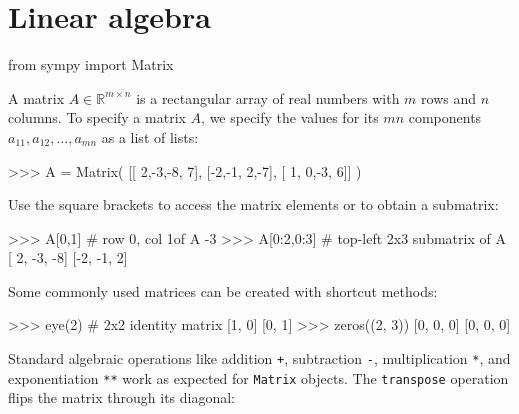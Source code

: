 



\section{Linear algebra}
\label{sec:linear_algebra}



\small
\begin{verbatimtab}
from sympy import Matrix
\end{verbatimtab}
\normalsize

\noindent
A matrix $A \in \mathbb{R}^{m\times n}$ is a rectangular array of real numbers with $m$ rows and $n$ columns.
To specify a matrix $A$, we specify the values for its $mn$ components $a_{11}, a_{12}, \ldots, a_{mn}$
as a list of lists:

\small
\begin{verbatimtab}
>>> A = Matrix( [[ 2,-3,-8, 7],
                 [-2,-1, 2,-7],
                 [ 1, 0,-3, 6]] )
\end{verbatimtab}
\normalsize

\noindent
Use the square brackets to access the matrix elements or to obtain a submatrix:



\small
\begin{verbatimtab}
>>> A[0,1]            # row 0, col 1of A 
-3
>>> A[0:2,0:3]        # top-left 2x3 submatrix of A 
[ 2, -3, -8]
[-2, -1,  2]
\end{verbatimtab}
\normalsize

\noindent
Some commonly used matrices can be created with shortcut methods:



\small
\begin{verbatimtab}
>>> eye(2)            # 2x2 identity matrix
[1, 0]
[0, 1]
>>> zeros((2, 3))
[0, 0, 0]
[0, 0, 0]
\end{verbatimtab}
\normalsize



\noindent
Standard algebraic operations like 
addition \texttt{+}, subtraction \texttt{-}, multiplication \texttt{*},
and exponentiation \texttt{**} work as expected for \texttt{Matrix} objects.
%
The \texttt{transpose} operation flips the matrix through its diagonal:

